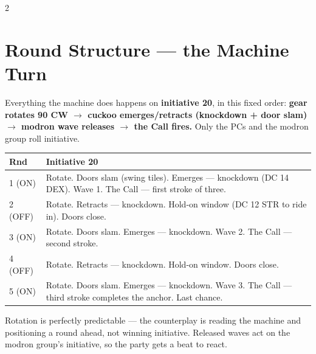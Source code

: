 \documentclass[10pt,letterpaper]{article}
\begin{document}
\begin{multicols}{2}
\section*{Round Structure --- the Machine Turn}

Everything the machine does happens on \textbf{initiative 20}, in this fixed order: \textbf{gear rotates 90\textdegree{} CW $\to$ cuckoo emerges/retracts (knockdown + door slam) $\to$ modron wave releases $\to$ the Call fires.} Only the PCs and the modron group roll initiative.

\begin{tabularx}{\columnwidth}{@{}lX@{}}
\toprule
\textbf{Rnd} & \textbf{Initiative 20} \\
\midrule
1 (ON) & Rotate. Doors slam (swing tiles). Emerges --- knockdown (DC 14 DEX). Wave 1. The Call --- first stroke of three. \\
2 (OFF) & Rotate. Retracts --- knockdown. Hold-on window (DC 12 STR to ride in). Doors close. \\
3 (ON) & Rotate. Doors slam. Emerges --- knockdown. Wave 2. The Call --- second stroke. \\
4 (OFF) & Rotate. Retracts --- knockdown. Hold-on window. Doors close. \\
5 (ON) & Rotate. Doors slam. Emerges --- knockdown. Wave 3. The Call --- third stroke completes the anchor. Last chance. \\
\bottomrule
\end{tabularx}

\vspace{4pt}
Rotation is perfectly predictable --- the counterplay is reading the machine and positioning a round ahead, not winning initiative. Released waves act on the modron group's initiative, so the party gets a beat to react.

\columnbreak


\end{multicols}
\end{document}
